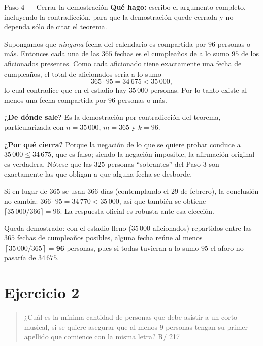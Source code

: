 \documentclass[11pt]{article}
\begin{document}
\begin{paso}{Paso 4 --- Cerrar la demostración}
\textbf{Qué hago:} escribo el argumento completo, incluyendo la contradicción, para que la demostración quede cerrada y no dependa sólo de citar el teorema.

Supongamos que \emph{ninguna} fecha del calendario es compartida por $96$ personas o más. Entonces cada una de las $365$ fechas es el cumpleaños de a lo sumo $95$ de los aficionados presentes. Como cada aficionado tiene exactamente una fecha de cumpleaños, el total de aficionados sería a lo sumo
\[
365\cdot 95 = 34\,675 < 35\,000 ,
\]
lo cual contradice que en el estadio hay $35\,000$ personas. Por lo tanto existe al menos una fecha compartida por $96$ personas o más.

\textbf{¿De dónde sale?} Es la demostración por contradicción del teorema, particularizada con $n=35\,000$, $m=365$ y $k=96$.

\textbf{¿Por qué cierra?} Porque la negación de lo que se quiere probar conduce a $35\,000\le 34\,675$, que es falso; siendo la negación imposible, la afirmación original es verdadera. Nótese que las $325$ personas ``sobrantes'' del Paso 3 son exactamente las que obligan a que alguna fecha se desborde.
\end{paso}

\begin{nota}
Si en lugar de $365$ se usan $366$ días (contemplando el 29 de febrero), la conclusión no cambia: $366\cdot 95=34\,770<35\,000$, así que también se obtiene $\lceil 35\,000/366\rceil=96$. La respuesta oficial es robusta ante esa elección.
\end{nota}

\begin{resp}
Queda demostrado: con el estadio lleno ($35\,000$ aficionados) repartidos entre las $365$ fechas de cumpleaños posibles, alguna fecha reúne al menos $\left\lceil 35\,000/365\right\rceil=\mathbf{96}$ personas, pues si todas tuvieran a lo sumo $95$ el aforo no pasaría de $34\,675$.
\end{resp}

\section*{Ejercicio 2}

\begin{quote}
¿Cuál es la mínima cantidad de personas que debe asistir a un corto musical, si se quiere asegurar que al menos 9 personas tengan su primer apellido que comience con la misma letra? \hfill R/ 217
\end{quote}
\end{document}
